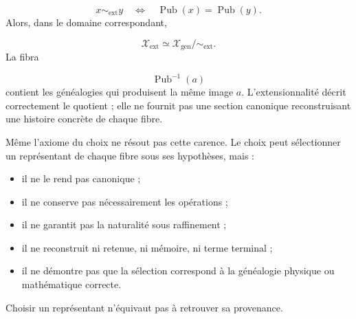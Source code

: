 \[
x\sim_{\mathrm{ext}}y
\quad\Longleftrightarrow\quad
\operatorname{Pub}(x)
=
\operatorname{Pub}(y).
\]
Alors, dans le domaine correspondant,\par
\[
\mathscr X_{\mathrm{ext}}
\simeq
\mathscr X_{\mathrm{gen}}/
{\sim_{\mathrm{ext}}}.
\]
La fibra\par
\[
\operatorname{Pub}^{-1}(a)
\]
contient les généalogies qui produisent la même image \(a\). L’extensionnalité décrit correctement le quotient ; elle ne fournit pas une section canonique reconstruisant une histoire concrète de chaque fibre.\par
Même l’axiome du choix ne résout pas cette carence. Le choix peut sélectionner un représentant de chaque fibre sous ses hypothèses, mais :\par
\begin{itemize}
\item il ne le rend pas canonique ;
\item il ne conserve pas nécessairement les opérations ;
\item il ne garantit pas la naturalité sous raffinement ;
\item il ne reconstruit ni retenue, ni mémoire, ni terme terminal ;
\item il ne démontre pas que la sélection correspond à la généalogie physique ou mathématique correcte.
\end{itemize}
Choisir un représentant n’équivaut pas à retrouver sa provenance.\par
{}

